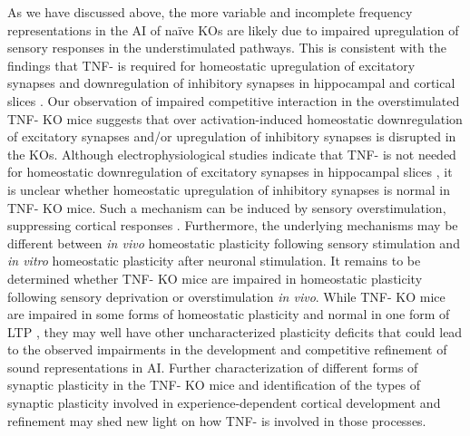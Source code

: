 As we have discussed above, the more variable and incomplete frequency representations in the AI of na\"ive KOs are likely due to impaired upregulation of sensory responses in the understimulated pathways. This is consistent with the findings that TNF-\textalpha{} is required for homeostatic upregulation of excitatory synapses and downregulation of inhibitory synapses in hippocampal and cortical slices \cite{Stellwagen2006, Kaneko2008}. Our observation of impaired competitive interaction in the overstimulated TNF-\textalpha{} KO mice suggests that over activation-induced homeostatic downregulation of excitatory synapses and/or upregulation of inhibitory synapses is disrupted in the KOs. Although electrophysiological studies indicate that TNF-\textalpha{} is not needed for homeostatic downregulation of excitatory synapses in hippocampal slices \cite{Stellwagen2006}, it is unclear whether homeostatic upregulation of inhibitory synapses is normal in TNF-\textalpha{} KO mice. Such a mechanism can be induced by sensory overstimulation, suppressing cortical responses \cite{Knott2002}. Furthermore, the underlying mechanisms may be different between \textit{in vivo} homeostatic plasticity following sensory stimulation and \textit{in vitro} homeostatic plasticity after neuronal stimulation. It remains to be determined whether TNF-\textalpha{} KO mice are impaired in homeostatic plasticity following sensory deprivation or overstimulation \textit{in vivo}. While TNF-\textalpha{} KO mice are impaired in some forms of homeostatic plasticity and normal in one form of LTP \cite{Stellwagen2006, Kaneko2008}, they may well have other uncharacterized plasticity deficits that could lead to the observed impairments in the development and competitive refinement of sound representations in AI. Further characterization of different forms of synaptic plasticity in the TNF-\textalpha{} KO mice and identification of the types of synaptic plasticity involved in experience-dependent cortical development and refinement may shed new light on how TNF-\textalpha{} is involved in those processes.

